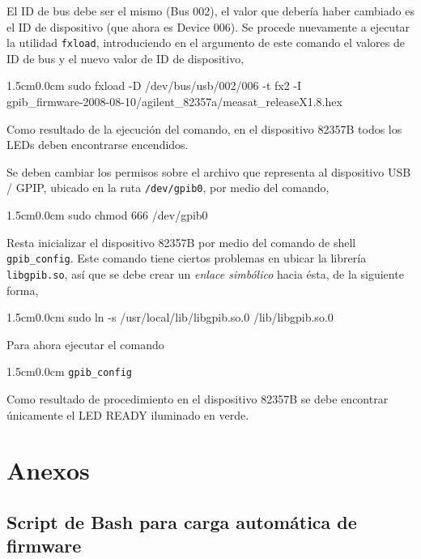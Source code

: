 \documentclass[paper=letter,oneside,fontsize=11pt, parskip=full]{scrartcl}
\newenvironment{code}
	{\begin{adjustwidth}{1.5cm}{0.0cm}\ttfamily}
	{\end{adjustwidth}}
\begin{document}
		El ID de bus debe ser el mismo (Bus 002), el valor que debería haber cambiado es el ID de dispositivo (que ahora es Device 006). Se procede nuevamente a ejecutar la utilidad \texttt{fxload}, introduciendo en el argumento de este comando el valores de ID de bus y el nuevo valor de ID de dispositivo,
		
		\begin{code}
			sudo fxload -D /dev/bus/usb/002/006  -t fx2 -I \\ gpib\_firmware-2008-08-10/agilent\_82357a/measat\_releaseX1.8.hex
		\end{code}
		
		Como resultado de la ejecución del comando, en el dispositivo 82357B todos los LEDs deben encontrarse encendidos.		
		
		Se deben cambiar los permisos sobre el archivo que representa al dispositivo USB / GPIP, ubicado en la ruta \texttt{/dev/gpib0}, por medio del comando,
		
		\begin{code}
			sudo chmod 666 /dev/gpib0
		\end{code}
		
		Resta inicializar el dispositivo 82357B por medio del comando de shell \texttt{gpib\_config}. Este comando tiene ciertos problemas en ubicar la librería \texttt{libgpib.so}, así que se debe crear un \emph{enlace simbólico} hacia ésta, de la siguiente forma,
		
		\begin{code}
			sudo ln -s /usr/local/lib/libgpib.so.0 /lib/libgpib.so.0
		\end{code}
		
		Para ahora ejecutar el comando
			
		\begin{code}
			\texttt{gpib\_config}
		\end{code}
	
		Como resultado de procedimiento en el dispositivo 82357B se debe encontrar únicamente el LED READY iluminado en verde.
			
	\section{Anexos}	
		
	\subsection{Script de Bash para carga automática de firmware}
	
\end{document}
